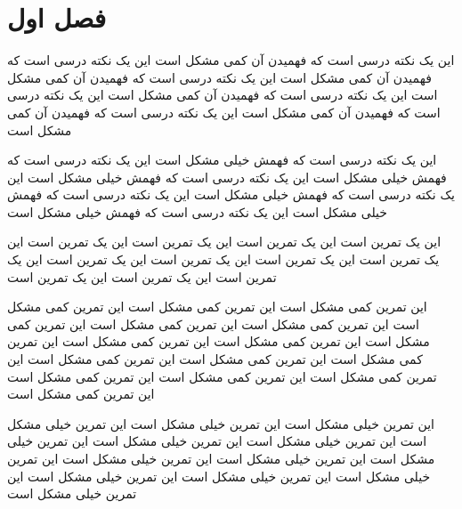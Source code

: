 \documentclass{book}
\begin{document}
\chapter{فصل اول}
\begin{danger}
این یک نکته درسی است که فهمیدن آن کمی مشکل است این یک نکته درسی است که فهمیدن آن کمی مشکل است این یک نکته درسی است که فهمیدن آن کمی مشکل است این یک نکته درسی است که فهمیدن آن کمی مشکل است این یک نکته درسی است که فهمیدن آن کمی مشکل است این یک نکته درسی است که فهمیدن آن کمی مشکل است
\end{danger}
\begin{ddanger}
این یک نکته درسی است که فهمش خیلی مشکل است این یک نکته درسی است که فهمش خیلی مشکل است این یک نکته درسی است که فهمش خیلی مشکل است این یک نکته درسی است که فهمش خیلی مشکل است این یک نکته درسی است که فهمش خیلی مشکل است این یک نکته درسی است که فهمش خیلی مشکل است
\end{ddanger}
\begin{exercise}
این یک تمرین است این یک تمرین است این یک تمرین است این یک تمرین است این یک تمرین است این یک تمرین است این یک تمرین است این یک تمرین است این یک تمرین است این یک تمرین است این یک تمرین است
\end{exercise}
\begin{dangerexercise}
این تمرین کمی مشکل است این تمرین کمی مشکل است این تمرین کمی مشکل است این تمرین کمی مشکل است این تمرین کمی مشکل است این تمرین کمی مشکل است این تمرین کمی مشکل است این تمرین کمی مشکل است این تمرین کمی مشکل است این تمرین کمی مشکل است این تمرین کمی مشکل است این تمرین کمی مشکل است این تمرین کمی مشکل است این تمرین کمی مشکل است این تمرین کمی مشکل است
\end{dangerexercise}
\begin{ddangerexercise}
این تمرین خیلی مشکل است این تمرین خیلی مشکل است این تمرین خیلی مشکل است این تمرین خیلی مشکل است این تمرین خیلی مشکل است این تمرین خیلی مشکل است این تمرین خیلی مشکل است این تمرین خیلی مشکل است این تمرین خیلی مشکل است این تمرین خیلی مشکل است این تمرین خیلی مشکل است این تمرین خیلی مشکل است
\end{ddangerexercise}
\end{document}

